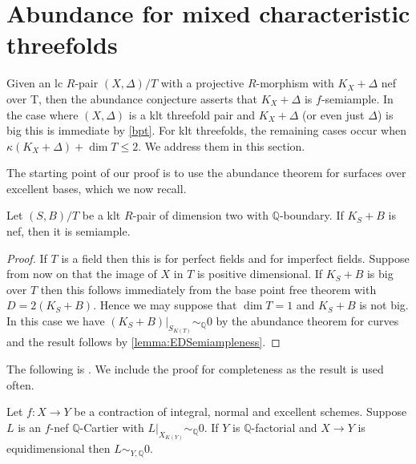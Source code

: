 \documentclass[a4paper,12pt]{book}
\begin{document}
	\section{Abundance for mixed characteristic threefolds}
	
	Given an lc $R$-pair $(X,\Delta)/T$ with a projective $R$-morphism with $K_{X}+\Delta$ nef over T, then the abundance conjecture asserts that $K_{X}+\Delta$ is $f$-semiample. 
	In the case where $(X,\Delta)$ is a klt threefold pair and $K_{X}+\Delta$ (or even just $\Delta$) is big this is immediate by \autoref{bpt}. For klt threefolds, the remaining cases occur when $\kappa(K_{X}+\Delta) + \dim T \leq 2$. We address them in this section.
	
	The starting point of our proof is to use the abundance theorem for surfaces over excellent bases, which we now recall. 
	
	\begin{theorem}\label{abundance-dim2}
		Let $(S,B)/T$ be a klt $R$-pair of dimension two with $\mathbb{Q}$-boundary. If $K_{S}+B$ is nef, then it is semiample.
	\end{theorem}
	
	\begin{proof}	
		If $T$ is a field then this is \cite[Theorem 1.2]{fujino2012log} for perfect fields and \cite{tanaka2020abundance} for imperfect fields. 
		Suppose from now on that the image of $X$ in $T$ is positive dimensional.
		If $K_{S}+B$ is big over $T$ then this follows immediately from the base point free theorem \cite[Theorem 4.2]{tanaka2018minimal} with $D=2(K_{S}+B)$. Hence we may suppose that $\dim T=1$ and $K_{S}+B$ is not big. In this case we have $(K_{S}+B)|_{S_{K(T)}} \sim_{\mathbb{Q}} 0$ by the abundance theorem for curves and the result follows by \autoref{lemma:EDSemiampleness}. 
	\end{proof}
	
	The following is \cite[Lemma 2.17]{cascini2020relative}. We include the proof for completeness as the result is used often.
	
	
	\begin{lemma}\label{lemma:EDSemiampleness}
		Let $f\colon X \to Y$ be a contraction of integral, normal and excellent schemes. Suppose $L$ is an $f$-nef $\mathbb{Q}$-Cartier with $L|_{X_{K(Y)}} \sim_{\mathbb{Q}} 0$. If $Y$ is $\mathbb{Q}$-factorial and $X \to Y$ is equidimensional then $L \sim_{Y,\mathbb{Q}} 0$.
	\end{lemma}
	
\end{document}
